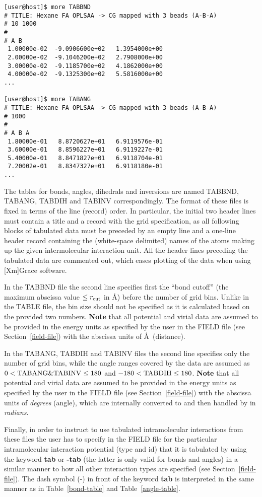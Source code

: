 \begin{verbatim}
[user@host]$ more TABBND
# TITLE: Hexane FA OPLSAA -> CG mapped with 3 beads (A-B-A)
# 10 1000
#
# A B
 1.00000e-02  -9.0906600e+02   1.3954000e+00
 2.00000e-02  -9.1046200e+02   2.7908000e+00
 3.00000e-02  -9.1185700e+02   4.1862000e+00
 4.00000e-02  -9.1325300e+02   5.5816000e+00
...

[user@host]$ more TABANG
# TITLE: Hexane FA OPLSAA -> CG mapped with 3 beads (A-B-A)
# 1000
#
# A B A
 1.80000e-01   8.8720627e+01   6.9119576e-01
 3.60000e-01   8.8596227e+01   6.9119227e-01
 5.40000e-01   8.8471827e+01   6.9118704e-01
 7.20002e-01   8.8347327e+01   6.9118180e-01
...
\end{verbatim}

The tables for bonds, angles, dihedrals and inversions
are named TABBND, TABANG, TABDIH and TABINV correspondingly.
The format of these files is fixed in terms of the line
(record) order.  In particular, the initial two header
lines must contain a title and a record with the grid
specification, as all following blocks of tabulated data
must be preceded by an empty line and a one-line header
record containing the (white-space delimited) names
of the atoms making up the given intermolecular interaction
unit.  All the header lines preceding the tabulated data
are commented out, which eases plotting of the data when
using [Xm]Grace software.

In the TABBND file the second line specifies first the
``bond cutoff'' (the maximum abscissa value $\le r_{\rm cut}$ in \AA)
before the number of grid bins.  Unlike in the TABLE file,
the bin size should not be specified as it is calculated
based on the provided two numbers.  {\bf Note} that all
potential and virial data are assumed to be provided in
the energy units as specified by the user in the FIELD
file (see Section~\ref{field-file}) with the abscissa units
of \AA~(distance).

In the TABANG, TABDIH and TABINV files the second line
specifies only the number of grid bins, while the angle
ranges covered by the data are assumed as $0 < {\rm TABANG \& TABINV} \le 180$
and  $-180 < {\rm TABDIH} \le 180$.  {\bf Note} that all
potential and virial data are assumed to be provided in
the energy units as specified by the user in the FIELD
file (see Section~\ref{field-file}) with the abscissa units
of {\em degrees} (angle), which are internally converted
to and then handled by \D in {\em radians}.

Finally, in order to instruct \D to use tabulated
intramolecular interactions from these files the user
has to specify in the FIELD file for the particular
intramolecular interaction potential (type and id) that
it is tabulated by using the keyword {\bf tab} or {\bf -tab}
(the latter is only valid for bonds and angles) in a similar
manner to how all other interaction types are specified
(see Section~\ref{field-file}).  The dash symbol (-) in
front of the keyword {\bf tab} is interpreted in the
same manner as in Table~\ref{bond-table} and Table~\ref{angle-table}.
